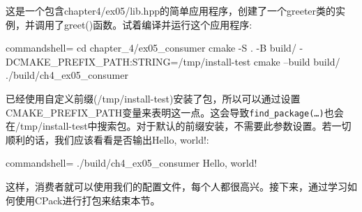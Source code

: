这是一个包含chapter4/ex05/lib.hpp的简单应用程序，创建了一个greeter类的实例，并调用了greet()函数。试着编译并运行这个应用程序:

\begin{tcblisting}{commandshell={}}
cd chapter_4/ex05_consumer
cmake -S . -B build/ -DCMAKE_PREFIX_PATH:STRING=/tmp/install-test
cmake --build build/
./build/ch4_ex05_consumer
\end{tcblisting}

已经使用自定义前缀(/tmp/install-test)安装了包，所以可以通过设置CMAKE\_PREFIX\_PATH变量来表明这一点。这会导致\texttt{find\_package(…)}也会在/tmp/install-test中搜索包。对于默认的前缀安装，不需要此参数设置。若一切顺利的话，我们应该看看是否输出Hello, world!: 

\begin{tcblisting}{commandshell={}}
./build/ch4_ex05_consumer
Hello, world!
\end{tcblisting}

这样，消费者就可以使用我们的配置文件，每个人都很高兴。接下来，通过学习如何使用CPack进行打包来结束本节。



























